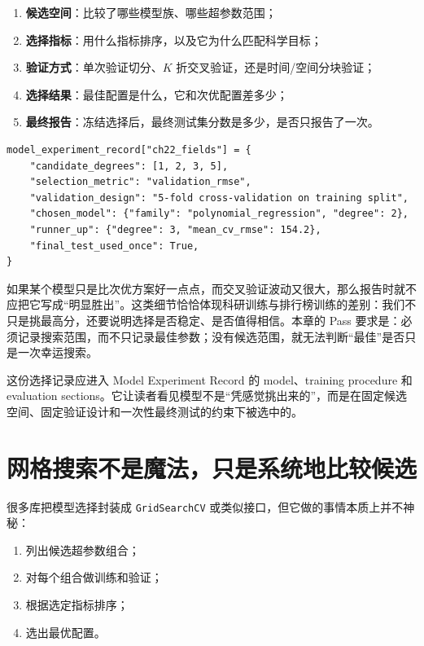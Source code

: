 \begin{enumerate}
    \item \textbf{候选空间}：比较了哪些模型族、哪些超参数范围；
    \item \textbf{选择指标}：用什么指标排序，以及它为什么匹配科学目标；
    \item \textbf{验证方式}：单次验证切分、$K$ 折交叉验证，还是时间/空间分块验证；
    \item \textbf{选择结果}：最佳配置是什么，它和次优配置差多少；
    \item \textbf{最终报告}：冻结选择后，最终测试集分数是多少，是否只报告了一次。
\end{enumerate}

\begin{examplebox}[模型选择记录的最小骨架]
\begin{lstlisting}[style=pythonstyle]
model_experiment_record["ch22_fields"] = {
    "candidate_degrees": [1, 2, 3, 5],
    "selection_metric": "validation_rmse",
    "validation_design": "5-fold cross-validation on training split",
    "chosen_model": {"family": "polynomial_regression", "degree": 2},
    "runner_up": {"degree": 3, "mean_cv_rmse": 154.2},
    "final_test_used_once": True,
}
\end{lstlisting}
\end{examplebox}

如果某个模型只是比次优方案好一点点，而交叉验证波动又很大，那么报告时就不应把它写成“明显胜出”。这类细节恰恰体现科研训练与排行榜训练的差别：我们不只是挑最高分，还要说明选择是否稳定、是否值得相信。本章的 Pass 要求是：必须记录搜索范围，而不只记录最佳参数；没有候选范围，就无法判断“最佳”是否只是一次幸运搜索。

这份选择记录应进入 Model Experiment Record 的 model、training procedure 和 evaluation sections。它让读者看见模型不是“凭感觉挑出来的”，而是在固定候选空间、固定验证设计和一次性最终测试的约束下被选中的。

\section{网格搜索不是魔法，只是系统地比较候选}

很多库把模型选择封装成 \texttt{GridSearchCV} 或类似接口，但它做的事情本质上并不神秘：

\begin{enumerate}
    \item 列出候选超参数组合；
    \item 对每个组合做训练和验证；
    \item 根据选定指标排序；
    \item 选出最优配置。
\end{enumerate}

